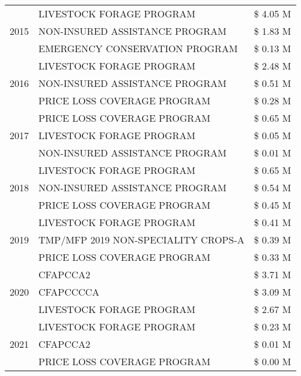 \begin{tabular}{llr}
\cline{1-3}
\multirow[t]{3}{*}{2015} & LIVESTOCK FORAGE PROGRAM & \$ 4.05 M \\
 & NON-INSURED ASSISTANCE PROGRAM & \$ 1.83 M \\
 & EMERGENCY CONSERVATION PROGRAM & \$ 0.13 M \\
\cline{1-3}
\multirow[t]{3}{*}{2016} & LIVESTOCK FORAGE PROGRAM & \$ 2.48 M \\
 & NON-INSURED ASSISTANCE PROGRAM & \$ 0.51 M \\
 & PRICE LOSS COVERAGE PROGRAM & \$ 0.28 M \\
\cline{1-3}
\multirow[t]{3}{*}{2017} & PRICE LOSS COVERAGE PROGRAM & \$ 0.65 M \\
 & LIVESTOCK FORAGE PROGRAM & \$ 0.05 M \\
 & NON-INSURED ASSISTANCE PROGRAM & \$ 0.01 M \\
\cline{1-3}
\multirow[t]{3}{*}{2018} & LIVESTOCK FORAGE PROGRAM & \$ 0.65 M \\
 & NON-INSURED ASSISTANCE PROGRAM & \$ 0.54 M \\
 & PRICE LOSS COVERAGE PROGRAM & \$ 0.45 M \\
\cline{1-3}
\multirow[t]{3}{*}{2019} & LIVESTOCK FORAGE PROGRAM & \$ 0.41 M \\
 & TMP/MFP 2019 NON-SPECIALITY CROPS-A & \$ 0.39 M \\
 & PRICE LOSS COVERAGE PROGRAM & \$ 0.33 M \\
\cline{1-3}
\multirow[t]{3}{*}{2020} & CFAPCCA2 & \$ 3.71 M \\
 & CFAPCCCCA & \$ 3.09 M \\
 & LIVESTOCK FORAGE PROGRAM & \$ 2.67 M \\
\cline{1-3}
\multirow[t]{3}{*}{2021} & LIVESTOCK FORAGE PROGRAM & \$ 0.23 M \\
 & CFAPCCA2 & \$ 0.01 M \\
 & PRICE LOSS COVERAGE PROGRAM & \$ 0.00 M \\
\cline{1-3}
\bottomrule
\end{tabular}
